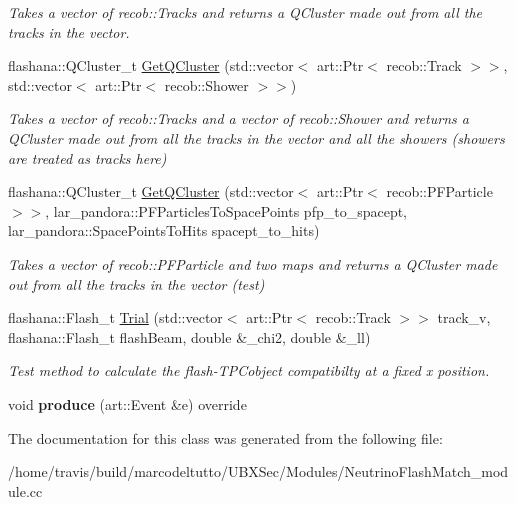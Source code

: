 \begin{DoxyCompactItemize}
\begin{DoxyCompactList}\small\item\em \-Takes a vector of recob\-::\-Tracks and returns a \-Q\-Cluster made out from all the tracks in the vector. \end{DoxyCompactList}\item 
\hypertarget{classNeutrinoFlashMatch_a9f4dea53f7e7aa983ec69859bf48a6bd}{flashana\-::\-Q\-Cluster\-\_\-t \hyperlink{classNeutrinoFlashMatch_a9f4dea53f7e7aa983ec69859bf48a6bd}{\-Get\-Q\-Cluster} (std\-::vector$<$ art\-::\-Ptr$<$ recob\-::\-Track $>$$>$, std\-::vector$<$ art\-::\-Ptr$<$ recob\-::\-Shower $>$$>$)}\label{classNeutrinoFlashMatch_a9f4dea53f7e7aa983ec69859bf48a6bd}

\begin{DoxyCompactList}\small\item\em \-Takes a vector of recob\-::\-Tracks and a vector of recob\-::\-Shower and returns a \-Q\-Cluster made out from all the tracks in the vector and all the showers (showers are treated as tracks here) \end{DoxyCompactList}\item 
\hypertarget{classNeutrinoFlashMatch_a93132a117b6ea907ba95bba4a6af6107}{flashana\-::\-Q\-Cluster\-\_\-t \hyperlink{classNeutrinoFlashMatch_a93132a117b6ea907ba95bba4a6af6107}{\-Get\-Q\-Cluster} (std\-::vector$<$ art\-::\-Ptr$<$ recob\-::\-P\-F\-Particle $>$$>$, lar\-\_\-pandora\-::\-P\-F\-Particles\-To\-Space\-Points pfp\-\_\-to\-\_\-spacept, lar\-\_\-pandora\-::\-Space\-Points\-To\-Hits spacept\-\_\-to\-\_\-hits)}\label{classNeutrinoFlashMatch_a93132a117b6ea907ba95bba4a6af6107}

\begin{DoxyCompactList}\small\item\em \-Takes a vector of recob\-::\-P\-F\-Particle and two maps and returns a \-Q\-Cluster made out from all the tracks in the vector (test) \end{DoxyCompactList}\item 
\hypertarget{classNeutrinoFlashMatch_aa957152a8c232e4b23cc7544aa6bfdd1}{flashana\-::\-Flash\-\_\-t \hyperlink{classNeutrinoFlashMatch_aa957152a8c232e4b23cc7544aa6bfdd1}{\-Trial} (std\-::vector$<$ art\-::\-Ptr$<$ recob\-::\-Track $>$$>$ track\-\_\-v, flashana\-::\-Flash\-\_\-t flash\-Beam, double \&\-\_\-chi2, double \&\-\_\-ll)}\label{classNeutrinoFlashMatch_aa957152a8c232e4b23cc7544aa6bfdd1}

\begin{DoxyCompactList}\small\item\em \-Test method to calculate the flash-\/\-T\-P\-Cobject compatibilty at a fixed x position. \end{DoxyCompactList}\item 
\hypertarget{classNeutrinoFlashMatch_a00578af5672ff925f80c1b9482c8b4ff}{void {\bfseries produce} (art\-::\-Event \&e) override}\label{classNeutrinoFlashMatch_a00578af5672ff925f80c1b9482c8b4ff}

\end{DoxyCompactItemize}


\-The documentation for this class was generated from the following file\-:\begin{DoxyCompactItemize}
\item 
/home/travis/build/marcodeltutto/\-U\-B\-X\-Sec/\-Modules/\-Neutrino\-Flash\-Match\-\_\-module.\-cc\end{DoxyCompactItemize}
